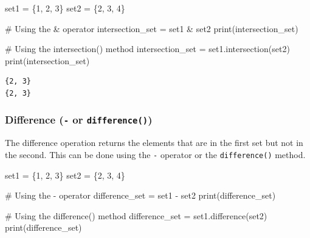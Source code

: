 \documentclass[
  letterpaper,
  DIV=11,
  numbers=noendperiod]{scrreprt}
\newenvironment{Shaded}{\begin{snugshade}}{\end{snugshade}}
\newcommand{\BuiltInTok}[1]{\textcolor[rgb]{0.00,0.23,0.31}{#1}}
\newcommand{\CommentTok}[1]{\textcolor[rgb]{0.37,0.37,0.37}{#1}}
\newcommand{\DecValTok}[1]{\textcolor[rgb]{0.68,0.00,0.00}{#1}}
\newcommand{\NormalTok}[1]{\textcolor[rgb]{0.00,0.23,0.31}{#1}}
\newcommand{\OperatorTok}[1]{\textcolor[rgb]{0.37,0.37,0.37}{#1}}
\begin{document}
\begin{Shaded}
\begin{Highlighting}[]
\NormalTok{set1 }\OperatorTok{=}\NormalTok{ \{}\DecValTok{1}\NormalTok{, }\DecValTok{2}\NormalTok{, }\DecValTok{3}\NormalTok{\}}
\NormalTok{set2 }\OperatorTok{=}\NormalTok{ \{}\DecValTok{2}\NormalTok{, }\DecValTok{3}\NormalTok{, }\DecValTok{4}\NormalTok{\}}

\CommentTok{\# Using the \& operator}
\NormalTok{intersection\_set }\OperatorTok{=}\NormalTok{ set1 }\OperatorTok{\&}\NormalTok{ set2}
\BuiltInTok{print}\NormalTok{(intersection\_set) }

\CommentTok{\# Using the intersection() method}
\NormalTok{intersection\_set }\OperatorTok{=}\NormalTok{ set1.intersection(set2)}
\BuiltInTok{print}\NormalTok{(intersection\_set)  }
\end{Highlighting}
\end{Shaded}

\begin{verbatim}
{2, 3}
{2, 3}
\end{verbatim}

\hypertarget{difference---or-difference}{%
\subsubsection{\texorpdfstring{Difference (\texttt{-} or
\texttt{difference()})}{Difference (- or difference())}}\label{difference---or-difference}}

The difference operation returns the elements that are in the first set
but not in the second. This can be done using the \texttt{-} operator or
the \texttt{difference()} method.

\begin{Shaded}
\begin{Highlighting}[]
\NormalTok{set1 }\OperatorTok{=}\NormalTok{ \{}\DecValTok{1}\NormalTok{, }\DecValTok{2}\NormalTok{, }\DecValTok{3}\NormalTok{\}}
\NormalTok{set2 }\OperatorTok{=}\NormalTok{ \{}\DecValTok{2}\NormalTok{, }\DecValTok{3}\NormalTok{, }\DecValTok{4}\NormalTok{\}}

\CommentTok{\# Using the {-} operator}
\NormalTok{difference\_set }\OperatorTok{=}\NormalTok{ set1 }\OperatorTok{{-}}\NormalTok{ set2}
\BuiltInTok{print}\NormalTok{(difference\_set) }

\CommentTok{\# Using the difference() method}
\NormalTok{difference\_set }\OperatorTok{=}\NormalTok{ set1.difference(set2)}
\BuiltInTok{print}\NormalTok{(difference\_set)  }
\end{Highlighting}
\end{Shaded}
\end{document}

